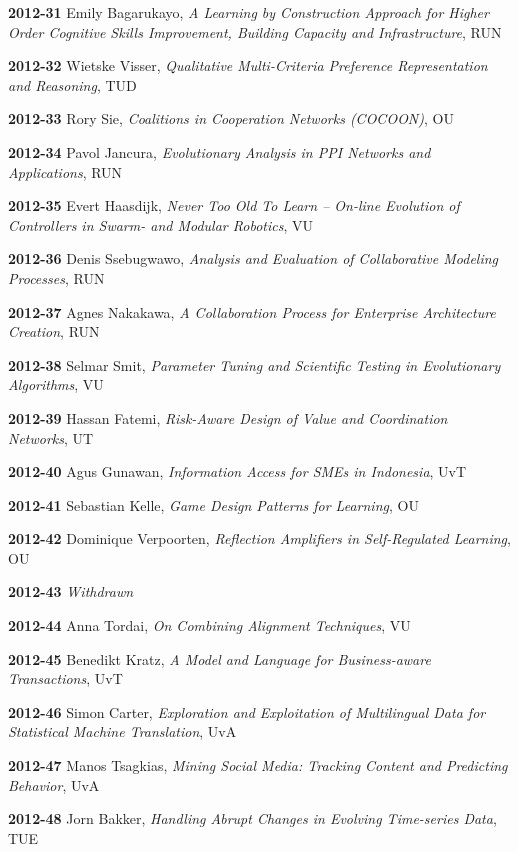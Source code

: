 \begin{multicols}{2}
\textbf{2012-31}   Emily Bagarukayo, \textit{A Learning by Construction Approach for Higher Order Cognitive Skills Improvement, Building Capacity and Infrastructure}, RUN

\textbf{2012-32}   Wietske Visser, \textit{Qualitative Multi-Criteria Preference Representation and Reasoning}, TUD

\textbf{2012-33}   Rory Sie, \textit{Coalitions in Cooperation Networks (COCOON)}, OU

\textbf{2012-34}   Pavol Jancura, \textit{Evolutionary Analysis in PPI Networks and Applications}, RUN

\textbf{2012-35}   Evert Haasdijk, \textit{Never Too Old To Learn -- On-line Evolution of Controllers in Swarm- and Modular Robotics}, VU

\textbf{2012-36}   Denis Ssebugwawo, \textit{Analysis and Evaluation of Collaborative Modeling Processes}, RUN

\textbf{2012-37}   Agnes Nakakawa, \textit{A Collaboration Process for Enterprise Architecture Creation}, RUN

\textbf{2012-38}   Selmar Smit, \textit{Parameter Tuning and Scientific Testing in Evolutionary Algorithms}, VU

\textbf{2012-39}   Hassan Fatemi, \textit{Risk-Aware Design of Value and Coordination Networks}, UT

\textbf{2012-40}   Agus Gunawan, \textit{Information Access for SMEs in Indonesia}, UvT

\textbf{2012-41}   Sebastian Kelle, \textit{Game Design Patterns for Learning}, OU

\textbf{2012-42}   Dominique Verpoorten, \textit{Reflection Amplifiers in Self-Regulated Learning}, OU

\textbf{2012-43}   \textit{Withdrawn}

\textbf{2012-44}   Anna Tordai, \textit{On Combining Alignment Techniques}, VU

\textbf{2012-45}   Benedikt Kratz, \textit{A Model and Language for Business-aware Transactions}, UvT

\textbf{2012-46}   Simon Carter, \textit{Exploration and Exploitation of Multilingual Data for Statistical Machine Translation}, UvA

\textbf{2012-47}   Manos Tsagkias, \textit{Mining Social Media: Tracking Content and Predicting Behavior}, UvA

\textbf{2012-48}   Jorn Bakker, \textit{Handling Abrupt Changes in Evolving Time-series Data}, TUE


\end{multicols}
